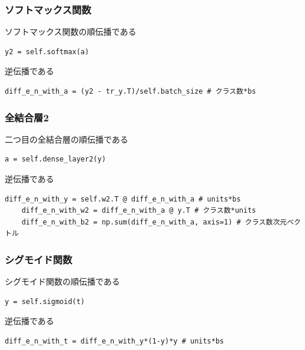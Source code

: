 \documentclass[platex,dvipdfmx]{jsarticle}
\begin{document}
  \subsubsection{ソフトマックス関数}

  ソフトマックス関数の順伝播である

  \begin{lstlisting}[caption=ex3.py, label=soft_fwd]
    y2 = self.softmax(a)
  \end{lstlisting}

  逆伝播である

  \begin{lstlisting}[caption=ex3.py, label=soft_bwd]
    diff_e_n_with_a = (y2 - tr_y.T)/self.batch_size # クラス数*bs
  \end{lstlisting}

  \subsubsection{全結合層2}

  二つ目の全結合層の順伝播である

  \begin{lstlisting}[caption=ex3.py, label=dense2_fwd]
    a = self.dense_layer2(y)
  \end{lstlisting}

  逆伝播である

  \begin{lstlisting}[caption=ex3.py, label=dense2_bwd]
    diff_e_n_with_y = self.w2.T @ diff_e_n_with_a # units*bs
    diff_e_n_with_w2 = diff_e_n_with_a @ y.T # クラス数*units
    diff_e_n_with_b2 = np.sum(diff_e_n_with_a, axis=1) # クラス数次元ベクトル
  \end{lstlisting}

  \subsubsection{シグモイド関数}

  シグモイド関数の順伝播である

  \begin{lstlisting}[caption=ex3.py, label=sig_fwd]
    y = self.sigmoid(t)
  \end{lstlisting}
  
  逆伝播である

  \begin{lstlisting}[caption=ex3.py, label=sig_bwd]
    diff_e_n_with_t = diff_e_n_with_y*(1-y)*y # units*bs
  \end{lstlisting}
\end{document}
